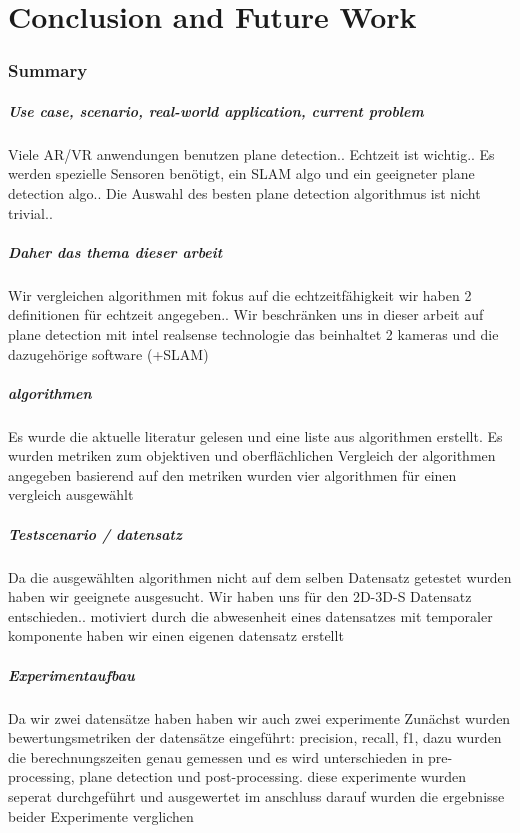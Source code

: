 \documentclass[main.tex]{subfiles}
\begin{document}
\chapter{Conclusion and Future Work}
\subsection{Summary}

\paragraph{Use case, scenario, real-world application, current problem}
Viele AR/VR anwendungen benutzen plane detection..
Echtzeit ist wichtig..
Es werden spezielle Sensoren benötigt, ein SLAM algo und ein geeigneter plane detection algo..
Die Auswahl des besten plane detection algorithmus ist nicht trivial..

\paragraph{Daher das thema dieser arbeit}
Wir vergleichen algorithmen mit fokus auf die echtzeitfähigkeit
wir haben 2 definitionen für echtzeit angegeben..
Wir beschränken uns in dieser arbeit auf plane detection mit intel realsense technologie
 das beinhaltet 2 kameras und die dazugehörige software (+SLAM)

\paragraph{algorithmen}
Es wurde die aktuelle literatur gelesen und eine liste aus algorithmen erstellt.
Es wurden metriken zum objektiven und oberflächlichen Vergleich der algorithmen angegeben
basierend auf den metriken wurden vier algorithmen für einen vergleich ausgewählt

\paragraph{Testscenario / datensatz}
Da die ausgewählten algorithmen nicht auf dem selben Datensatz getestet wurden haben wir 
geeignete ausgesucht.
Wir haben uns für den 2D-3D-S Datensatz entschieden..
motiviert durch die abwesenheit eines datensatzes mit temporaler komponente
 haben wir einen eigenen datensatz erstellt

\paragraph{Experimentaufbau}
Da wir zwei datensätze haben haben wir auch zwei experimente
Zunächst wurden bewertungsmetriken der datensätze eingeführt:
precision, recall, f1, 
dazu wurden die berechnungszeiten genau gemessen und es wird unterschieden in pre-processing,
plane detection und post-processing. 
diese experimente wurden seperat durchgeführt und ausgewertet
im anschluss darauf wurden die ergebnisse beider Experimente verglichen
\end{document}
